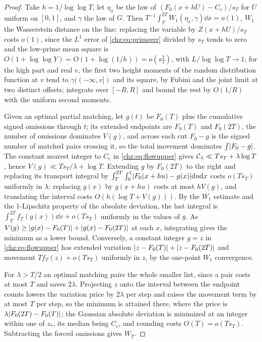 \begin{proof}
Take $h=1/\log\log T$, let $\eta_x$ be the law of $(F_0(x+hU)-C_c)/s_T$ for $U$ uniform on $[0,1]$, and $\gamma$ the law
of $G$. Then $T^{-1}\int_T^{2T}W_1(\eta_x,\gamma)\dd x=o(1)$, $W_1$ the Wasserstein distance on the line: replacing the
variable by $Z(x+hU)/s_T$ costs $o(1)$, since the $L^1$ error of \eqref{chz:eq:primeerr} divided by $s_T$ tends to zero
and the low-prime mean square is $O(1+\log\log Y)=O(1+\log(1/h))=o(s_T^2)$, with $L/\log\log T\to1$; for the high
part and real $v$, the first two height moments of the random distribution function at $v$ tend to
$\gamma((-\infty,v])$ and its square, by Fubini and the joint limit at two distinct offsets; integrate over $[-R,R]$
and bound the rest by $O(1/R)$ with the uniform second moments.

Given an optimal partial matching, let $g(t)$ be $F_0(T)$ plus the cumulative signed omissions through $t$; its
extended endpoints are $F_0(T)$ and $F_0(2T)$, the number of omissions dominates $V(g)$, and across each cut $F_0-g$
is the signed number of matched pairs crossing it, so the total movement dominates $\int\lvert F_0-g\rvert$. The constant
nearest integer to $C_c$ in \eqref{chz:eq:flowupper} gives $\mathcal{C}_\lambda\ll Ts_T+\lambda\log T$, hence
$V(g)\ll Ts_T/\lambda+\log T$. Extending $g$ by $F_0(2T)$ to the right and replacing its transport integral by
$\int_T^{2T}\int_0^1\lvert F_0(x+hu)-g(x)\rvert\mathrm{d} u\mathrm{d} x$ costs $o(Ts_T)$ uniformly in $\lambda$: replacing $g(x)$ by $g(x+hu)$ costs
at most $hV(g)$, and translating the interval costs $O(h(\log T+V(g)))$. By the $W_1$ estimate and the
$1$-Lipschitz property of the absolute deviation, the last integral is $\int_T^{2T}f_T(g(x))\dd x+o(Ts_T)$
uniformly in the values of $g$. As $V(g)\ge\lvert g(x)-F_0(T)\rvert+\lvert g(x)-F_0(2T)\rvert$ at each $x$, integrating gives the
minimum as a lower bound. Conversely, a constant integer $g=z$ in \eqref{chz:eq:flowupper} has extended variation
$\lvert z-F_0(T)\rvert+\lvert z-F_0(2T)\rvert$ and movement $Tf_T(z)+o(Ts_T)$ uniformly in $z$, by the one-point $W_1$ convergence.

For $\lambda>T/2$ an optimal matching pairs the whole smaller list, since a pair costs at most $T$ and saves $2\lambda$.
Projecting $z$ onto the interval between the endpoint counts lowers the variation price by $2\lambda$ per step and
raises the movement term by at most $T$ per step, so the minimum is attained there, where the price is
$\lambda\lvert F_0(2T)-F_0(T)\rvert$; the Gaussian absolute deviation is minimized at an integer within one of $z_*$, its
median being $C_c$, and rounding costs $O(T)=o(Ts_T)$. Subtracting the forced omissions gives $W_T$.
\end{proof}

